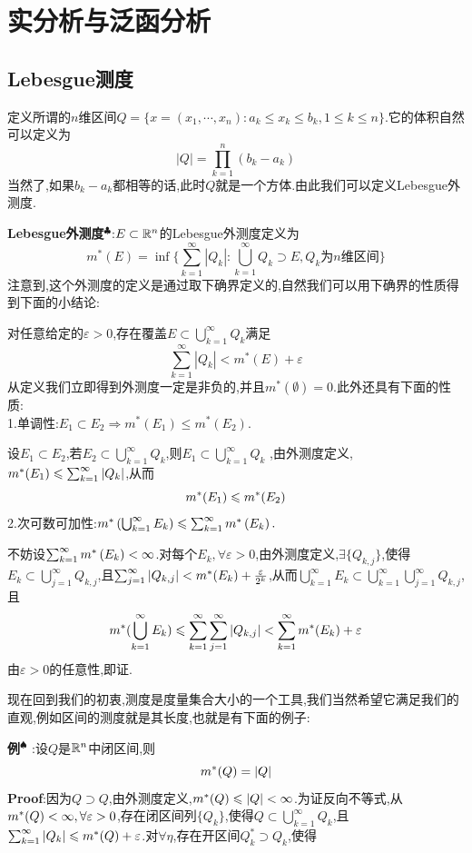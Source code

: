 \newpage
\section{实分析与泛函分析}
\subsection{Lebesgue测度}
定义所谓的$n$维区间$Q=\{x=(x_1,\cdots,x_n):a_k\leqslant x_k\leqslant b_k,1\leqslant k\leqslant n\}$.它的体积自然可以定义为
$$
|Q|=\prod^n_{k=1}(b_k-a_k)
$$
当然了,如果$b_k-a_k$都相等的话,此时$Q$就是一个方体.由此我们可以定义Lebesgue外测度.\par
\textbf{Lebesgue外测度}$^\clubsuit $:$E\subset \mathbb{R} ^n$的Lebesgue外测度定义为
$$
m^*(E)=\inf\{\sum^{\infty}_{k=1}|Q_k|:\bigcup^{\infty}_{k=1}Q_k\supset E,Q_k\text{为$n$维区间}\}
$$
注意到,这个外测度的定义是通过取下确界定义的,自然我们可以用下确界的性质得到下面的小结论:\par
对任意给定的$\varepsilon >0$,存在覆盖$E\subset \bigcup_{k=1}^{\infty}Q_k$满足
$$
\sum^{\infty}_{k=1}|Q_k|<m^*(E)+\varepsilon
$$
\qquad 从定义我们立即得到外测度一定是非负的,并且$m^*(\emptyset)=0$.此外还具有下面的性质:\\
1.单调性:$E_1\subset E_2\Rightarrow m^*(E_1)\leqslant m^*(E_2)$.\par
设$E_{1}\subset E_{2}$,若$E_2\subset\bigcup_{k=1}^{\infty}Q_{k}$,则$E_{1}\subset\bigcup_{k=1}^{\infty}Q_{k}$ ,由外测度定义,$m^*(E_{1})\leqslant\sum_{k=1}^{\infty}|Q_{k}|$,从而
$$
m^*(E_{1})\leqslant m^*(E_{2})
$$
2.次可数可加性:$m^*\left(\bigcup_{k=1}^{\infty}E_{k}\right)\leqslant\sum_{k=1}^{\infty}m^*\left(E_{k}\right).$\par
不妨设$\sum_{k=1}^{\infty}m^*\left(E_{k}\right)<\infty$.对每个$E_k,\forall\varepsilon>0$,由外测度定义,$\exists\{Q_{k,j}\}$,使得$E_{k}\subset\bigcup_{j=1}^{\infty}Q_{k,j}$,且$\sum_{j=1}^{\infty}|Q_{k,j}|<m^*(E_{k})+\frac{\varepsilon}{2^k}$,从而$\bigcup_{k=1}^{\infty}E_{k}\subset\bigcup_{k=1}^{\infty}\bigcup_{j=1}^{\infty}Q_{k,j}$,且  
$$
m^*(\bigcup_{k=1}^{\infty}E_{k})\leqslant\sum_{k=1}^{\infty}\sum_{j=1}^{\infty}|Q_{k,j}|<\sum_{k=1}^{\infty}m^*(E_{k})+\varepsilon
$$
由$\varepsilon>0$的任意性,即证.\par
现在回到我们的初衷,测度是度量集合大小的一个工具,我们当然希望它满足我们的直观,例如区间的测度就是其长度,也就是有下面的例子:\par
\textbf{例}$^\spadesuit$ :设$Q$是$\mathbb{R} ^n$中闭区间,则  
$$
m^* (Q)=|Q|
$$  
\qquad \textbf{Proof}:因为$Q\supset Q$,由外测度定义,$m^*(Q)\leqslant|Q|<\infty$.为证反向不等式,从$m^* (Q)<\infty, \forall\varepsilon>0$,存在闭区间列$\{Q_{k}\}$,使得$Q\subset\bigcup_{k=1}^{\infty}Q_{k}$,且$\sum_{k=1}^{\infty}|Q_{k}|\leqslant m^*(Q)+\varepsilon$.对$\forall\eta $,存在开区间$Q_{k}^{*}\supset Q_{k}$,使得  
